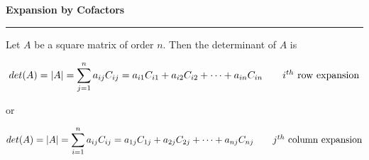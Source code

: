 \nopagenumbers
{\bf Expansion by Cofactors}
\vskip 1mm
\hrule

\vskip 6pt
Let $A$ be a square matrix of order $n$. Then the determinant of $A$ is

$$det(A)=|A|=\sum_{j=1}^na_{ij}C_{ij}=a_{i1}C_{i1}+a_{i2}C_{i2}+\cdots+a_{in}C_{in}\quad\hbox{\quad $i^{th}$ row expansion}$$

or

$$det(A)=|A|=\sum_{i=1}^na_{ij}C_{ij}=a_{1j}C_{1j}+a_{2j}C_{2j}+\cdots+a_{nj}C_{nj}\quad\hbox{\quad $j^{th}$ column expansion}$$

\vfill\eject
\bye
